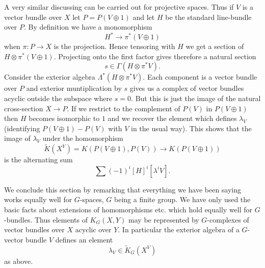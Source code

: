 \documentclass[leqno]{book}
\numberwithin{equation}{section}
\theoremstyle{definition}
\begin{document}
            A very similar discussing can be carried out for projective spaces. Thus if $V$ is a vector bundle over $X$ let $P=P(V\oplus 1)$ and let $H$ be the standard line-bundle over $P$. By definition we have a monomorphism 
            \begin{equation*}
              H^{*}\to \pi^{*}(V\oplus 1)
            \end{equation*}
            when $\pi:P\to X$ is the projection. Hence tensoring with $H$ we get a section of $H\otimes \pi^{*}(V\oplus 1)$. Projecting onto the first factor gives therefore a natural section
            \begin{equation*}
              s \in \Gamma (H \otimes \pi^{*}V).
            \end{equation*}
            Consider the exterior algebra $\Lambda^{*}(H\otimes \pi^{*}V)$. Each component is a vector bundle over $P$ and exterior muntiplication by $s$ gives us a complex of vector bundles acyclic outside the subspace where $s=0$. But this is just the image of the natural cross-section $X\to P$. If we restrict to the complement of $P(V)$ in $P(V\oplus 1)$ then $H$ becomes isomorphic to $1$ and we recover the element which defines $\lambda_{V}$ (identifying $P(V\oplus 1)-P(V)$ with $V$ in the usual way). This shows that the image of $\lambda_{V}$ under the homomorphism
            \begin{equation*}
              \tilde{K}(X^{V})=K(P(V\oplus 1),P(V))\to K(P(V\oplus 1))
            \end{equation*}
            is the alternating sum
            \begin{equation*}
              \sum (-1)^{i}[H]^{i}[\lambda^{i}V].
            \end{equation*}

            We conclude this section by remarking that everything we have been saying works equally well for $G$-spaces, $G$ being a finite group. We have only used the basic facts about extensions of homomorphisms etc. which hold equally well for $G$-bundles. Thus elements of $K_{G}(X,Y)$ may be represented by $G$-complexes of vector bundles over $X$ acyclic over $Y$. In particular the exterior algebra of a $G$-vector bundle $V$ defines an element
            \begin{equation*}
              \lambda_{V} \in \tilde{K}_{G}(X^{V})
            \end{equation*}
            as above.
        
    \newpage
\end{document}
